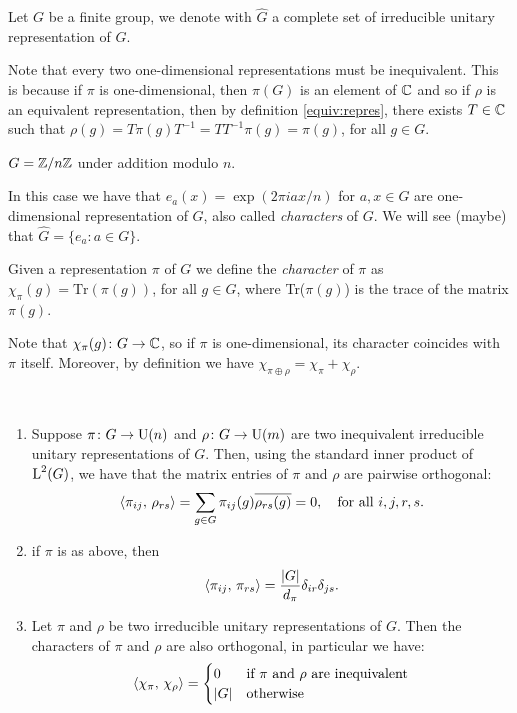\begin{defn}
Let $G$ be a finite group, we denote with $\hat{G}$ a complete set of irreducible unitary representation of $G$.
\end{defn}
\begin{rem}
Note that every two one-dimensional representations must be inequivalent. This is because if $\pi$ is one-dimensional, then $\pi(G)$ is an element of ${\mathbb C}$ and so if $\rho$ is an equivalent representation, then by definition \ref{equiv:repres}, there exists $T\in {\mathbb C}$ such that $\rho(g)=T\pi(g) T^{-1} = TT^{-1}\pi(g)=\pi(g)$, for all $g\in G$.
\end{rem}
\begin{exmp}
$G={\mathbb Z}/n{\mathbb Z}$ under addition modulo $n$.

In this case we have that $e_a(x)=\exp(2\pi iax/n)$ for $a,x\in G$ are one-dimensional representation of $G$, also called \emph{characters} of $G$. We will see (maybe) that $\hat{G}=\{e_a\colon a \in G\}$. 
\end{exmp}
\begin{defn}
Given a representation $\pi$ of $G$ we define the \emph{character} of $\pi$ as $\chi_\pi(g)=\text{Tr}(\pi(g))$, for all $g \in G$, where Tr($\pi(g)$) is the trace of the matrix $\pi(g)$.
\end{defn}
\begin{rem}
Note that $\chi_\pi(g)\colon G\rightarrow {\mathbb C}$, so if $\pi$ is one-dimensional, its character coincides with $\pi$ itself. Moreover, by definition we have $\chi_{\pi\oplus\rho}=\chi_{\pi} + \chi_\rho$.
\end{rem}
\begin{theorem}~ 
\label{thm:schurel}
\begin{enumerate}
\item Suppose $\pi\colon G\rightarrow \operatorname{U}(n)$ and $\rho\colon G\rightarrow \operatorname{U}(m)$ are two inequivalent irreducible unitary representations of $G$. Then, using the standard inner product of $\operatorname{L}^2(G)$, we have that the matrix entries of $\pi$ and $\rho$ are pairwise orthogonal:
\[
\braket{\pi_{ij},\, \rho_{rs}}=\sum_{g\in G}\pi_{ij}(g)\overline{\rho_{rs}(g)}=0, \quad \text{for all $i,j,r,s.$}
\]
\item if $\pi$ is as above, then 
\[
\braket{\pi_{ij},\, \pi_{rs}}=\frac{\lvert G\rvert}{d_\pi}\delta_{ir}\delta_{js}.
\]
\item Let $\pi$ and $\rho$ be two irreducible unitary representations of $G$. Then the characters of $\pi$ and $\rho$ are also orthogonal, in particular we have:
\[
\braket{\chi_\pi,\, \chi_\rho}=
\begin{cases}
0 &\text{if $\pi$ and $\rho$ are inequivalent} \\
\lvert G\rvert &\text{otherwise}
\end{cases}
\]
\end{enumerate}
\end{theorem}
